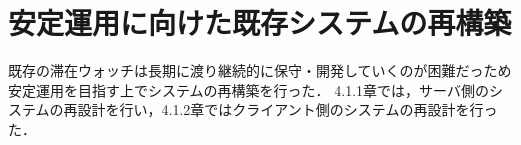 





\section{安定運用に向けた既存システムの再構築}\label{4.1}

既存の滞在ウォッチは長期に渡り継続的に保守・開発していくのが困難だっため安定運用を目指す上でシステムの再構築を行った．
4.1.1章では，サーバ側のシステムの再設計を行い，4.1.2章ではクライアント側のシステムの再設計を行った．














